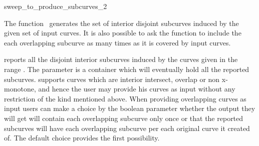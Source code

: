 

\begin{ccRefFunction}[CGAL::]{sweep_to_produce_subcurves_2}  %


\ccDefinition

The function \ccRefName\ generates the set of interior disjoint
subcurves induced by the given set of input curves. It is also
possible to ask the function to include the each overlapping subcurve
as many times as it is covered by input curves.

\def\ccLongParamLayout{\ccTrue} 

   {reports all the disjoint interior subcurves induced by the curves
   given in the range \ccStyle{[curves_begin, curves_end)}. The
   parameter  is a container which will eventually
   hold all the reported
   subcurves.  supports
   curves which are interior intersect, overlap or non x-monotone, and
   hence the user may provide his curves as input without any
   restriction of the kind mentioned above. When providing overlapping
   curves as input users can make a choice by the boolean parameter
    whether the output they will get will contain
   each overlapping subcurve only once or that the reported subcurves
   will have each overlapping subcurve per each original curve it
   created of. The default choice provides the first possibility.}

\ccSeeAlso

 \\


\end{ccRefFunction}
